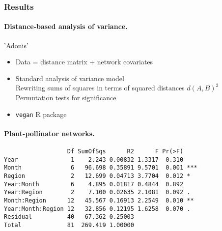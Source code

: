\documentclass[8pt]{beamer}
\begin{document}
\begin{frame}[fragile] \frametitle{Results}

  \paragraph{Distance-based analysis of variance.} 'Adonis' 
  \begin{itemize}
    \item Data = distance matrix + network covariates
    \item Standard analysis of variance model \\  
    \ra Rewriting sums of squares in terms of squared distances $d(A, B)^2$ \\
    \ra Permutation tests for significance
    \item {\tt vegan} R package 
  \end{itemize}
  
  \bigskip \pause
  \paragraph{Plant-pollinator networks.}  {\small
\begin{verbatim}
                  Df SumOfSqs      R2      F Pr(>F)    
Year               1    2.243 0.00832 1.3317  0.310    
Month              6   96.698 0.35891 9.5701  0.001 ***
Region             2   12.699 0.04713 3.7704  0.012 *  
Year:Month         6    4.895 0.01817 0.4844  0.892    
Year:Region        2    7.100 0.02635 2.1081  0.092 .  
Month:Region      12   45.567 0.16913 2.2549  0.010 ** 
Year:Month:Region 12   32.856 0.12195 1.6258  0.070 .  
Residual          40   67.362 0.25003                  
Total             81  269.419 1.00000                  
\end{verbatim} }
  
\end{frame}
\end{document}
